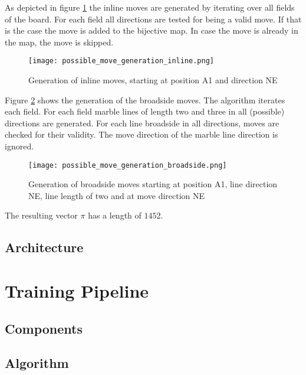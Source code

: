 \begin{enumerate}
          As depicted in figure \ref{possible_move_generation_inline} the inline moves are generated by iterating over all fields of the board. For each field all directions are tested for being a valid move. If that is the case the move is added to the bijective map. In case the move is already in the map, the move is skipped.

          \begin{figure}
              \centering
              \texttt{[image: possible\_move\_generation\_inline.png]}
              \caption{Generation of inline moves, starting at position A1 and direction NE}
              \label{possible_move_generation_inline}
          \end{figure}

          Figure \ref{possible_move_generation_broadside} shows the generation of the broadside moves. The algorithm iterates each field. For each field marble lines of length two and three in all (possible) directions are generated. For each line broadside in all directions, moves are checked for their validity. The move direction of the marble line direction is ignored.

          \begin{figure}
              \centering
              \texttt{[image: possible\_move\_generation\_broadside.png]}
              \caption{Generation of broadside moves starting at position A1, line direction NE, line length of two and at move direction NE}
              \label{possible_move_generation_broadside}
          \end{figure}

          The resulting vector $\pi$ has a length of $1452$.
\end{enumerate}

\subsection{Architecture}

\section{Training Pipeline}
\subsection{Components}
\label{components}
\subsection{Algorithm}


